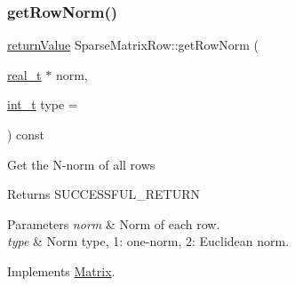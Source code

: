 \subsubsection{\texorpdfstring{get\+Row\+Norm()}{getRowNorm()}\hspace{0.1cm}{\footnotesize\ttfamily [2/2]}}
{\footnotesize\ttfamily \hyperlink{_message_handling_8hpp_a81d556f613bfbabd0b1f9488c0fa865e}{return\+Value} Sparse\+Matrix\+Row\+::get\+Row\+Norm (\begin{DoxyParamCaption}\item[{\hyperlink{qp_o_a_s_e_s__wrapper_8h_a0d00e2b3dfadee81331bbb39068570c4}{real\+\_\+t} $\ast$}]{norm,  }\item[{\hyperlink{_types_8hpp_ab6fd6105e64ed14a0c9281326f05e623}{int\+\_\+t}}]{type = {} }\end{DoxyParamCaption}) const\hspace{0.3cm}{\ttfamily [virtual]}}

Get the N-\/norm of all rows \begin{DoxyReturn}{Returns}
S\+U\+C\+C\+E\+S\+S\+F\+U\+L\+\_\+\+R\+E\+T\+U\+RN 
\end{DoxyReturn}

\begin{DoxyParams}{Parameters}
{\em norm} & Norm of each row. \\
\hline
{\em type} & Norm type, 1\+: one-\/norm, 2\+: Euclidean norm. \\
\hline
\end{DoxyParams}


Implements \hyperlink{class_matrix_a7809892ec8eefd5963915b56564917ed}{Matrix}.

\mbox{\label{class_sparse_matrix_row_aeb9063b8d66c518856e62b566ee48498}} 

